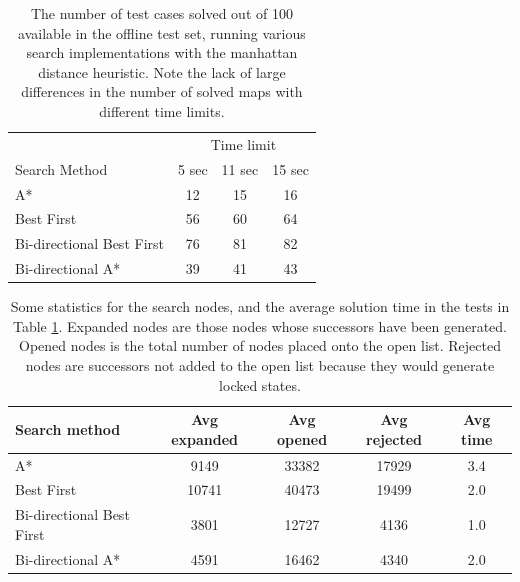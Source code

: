 \documentclass[a4paper,11pt]{article}
\begin{document}
\begin{table}
  \centering
  \begin{tabular}{lccc}
    & \multicolumn{3}{c}{Time limit}\\
    \cline{2-4}
    Search Method              &  5 sec  &  11 sec  &  15 sec  \\
    \hline
    A*                         &     12  &      15  &      16  \\
    Best First                 &     56  &      60  &      64  \\
    Bi-directional Best First  &     76  &      81  &      82  \\
    Bi-directional A*          &     39  &      41  &      43  \\
  \end{tabular}

  \caption{The number of test cases solved out of 100 available in the offline
    test set, running various search implementations with the manhattan distance
    heuristic. Note the lack of large differences in the number of solved maps
    with different time limits.}
  \label{fig:passedtests}
\end{table}

\begin{table}[b]
  \centering
    \begin{tabular}{lcccc}
      Search method              &  Avg expanded  &  Avg opened  &  Avg rejected  &  Avg time  \\
      \hline
      A*                         &          9149  &       33382  &         17929  &           3.4  \\
      Best First                 &         10741  &       40473  &         19499  &           2.0  \\
      Bi-directional Best First  &          3801  &       12727  &          4136  &           1.0  \\
      Bi-directional A*          &          4591  &       16462  &          4340  &           2.0  \\
    \end{tabular}
  \caption{Some statistics for the search nodes, and the average solution time
    in the tests in Table \ref{fig:passedtests}. Expanded nodes are those nodes
    whose successors have been generated. Opened nodes is the total number of
    nodes placed onto the open list. Rejected nodes are successors not added to
    the open list because they would generate locked states.}
  \label{fig:timings}
\end{table}
\end{document}
